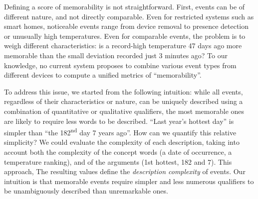 \documentclass[conference]{IEEEtran}
\begin{document}
Defining a score of memorability is not straightforward. First, events can be of different nature, and not directly
comparable. Even for restricted systems such as smart homes, noticeable events
range from device removal to presence detection or unusually high
temperatures. Even for comparable events, the problem is to weigh different characteristics: is a record-high temperature 47 days
ago more memorable than the small deviation recorded just 3 minutes ago? To
our knowledge, no current system proposes to combine various
event types from different devices to compute a unified metrics of
``memorability''.



To address this issue, we started from the following intuition: while all
events, regardless of their characteristics or nature, can be uniquely
described using a combination of quantitative or qualitative qualifiers, the most memorable ones are
likely to require less words to be described. ``Last year's hottest day'' is simpler than ``the 182\textsuperscript{nd} day 7 years ago''. How can we quantify this relative simplicity? We could evaluate the complexity of each
description, taking into account both the complexity of the concept words (a date
of occurrence, a temperature ranking), and of the arguments (1st hottest,
182 and 7). This approach, The resulting values define the  \emph{description complexity}
of events. Our intuition is that memorable events require simpler and less numerous qualifiers to be
unambiguously described than unremarkable ones.
\end{document}
